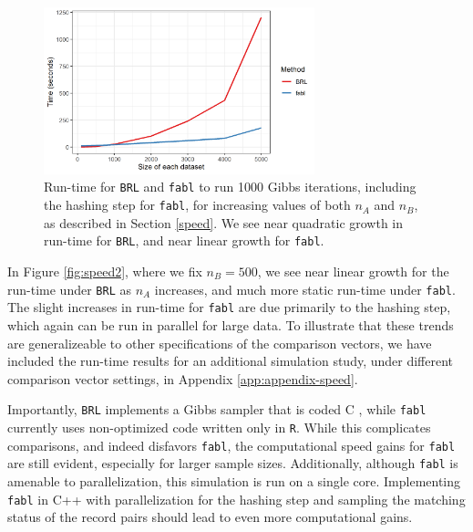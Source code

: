 \documentclass[ba]{imsart}
\begin{document}
	\begin{figure}[t]
		\begin{center} \includegraphics[width=0.7\textwidth]{../notes/figures/sadinle_speed_plot2} 
			\caption{Run-time for \texttt{BRL} and \texttt{fabl} to run 1000 Gibbs iterations, including the hashing step for \texttt{fabl}, for increasing values of both $n_A$ and $n_B$, as described in Section \ref{speed}. We see near quadratic growth in run-time for \texttt{BRL}, and near linear growth for \texttt{fabl}.}\label{fig:speed1}
		\end{center}
	\end{figure}
	
	In Figure \ref{fig:speed2}, where we fix $n_B = 500$, we see near linear growth for the run-time under \texttt{BRL} as $n_A$ increases, and much more static run-time under \texttt{fabl}. The slight increases in run-time for \texttt{fabl} are due primarily to the hashing step, which again can be run in parallel for large data. To illustrate that these trends are generalizeable to other specifications of the comparison vectors, we have included the run-time results for an additional simulation study, under different comparison vector settings, in Appendix \ref{app:appendix-speed}.
	
	Importantly, \texttt{BRL} implements a Gibbs sampler that is coded C \citep{sadinle_bayesian_2017}, while \texttt{fabl} currently uses non-optimized code written only in \texttt{R}.  While this complicates comparisons, and indeed disfavors \texttt{fabl}, the computational speed gains for \texttt{fabl} are still evident, especially for larger sample sizes.  Additionally, although \texttt{fabl} is amenable to parallelization, this simulation is run on a single core. Implementing \texttt{fabl} in C++ with parallelization for the hashing step and sampling the matching status of the record pairs should lead to even more computational gains.
	
\end{document}
